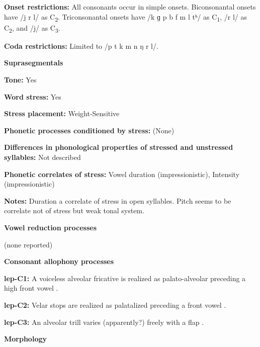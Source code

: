 \textbf{Onset restrictions:} All consonants occur in simple onsets. Biconsonantal onsets have /j r l/ as C\textsubscript{2}. Triconsonantal onsets have /k ɡ p b f m l tʰ/ as C\textsubscript{1}, /r l/ as C\textsubscript{2}, and /j/ as C\textsubscript{3}.



\textbf{Coda restrictions:} Limited to /p t k m n ŋ r l/.



\textbf{Suprasegmentals}



\textbf{Tone:} Yes



\textbf{Word stress:} Yes



\textbf{Stress placement:} Weight-Sensitive



\textbf{Phonetic processes conditioned by stress:} (None)



\textbf{Differences in phonological properties of stressed and unstressed syllables:} Not described



\textbf{Phonetic correlates of stress:} Vowel duration (impressionistic), Intensity (impressionistic)



\textbf{Notes:} Duration a correlate of stress in open syllables. Pitch seems to be correlate not of stress but weak tonal system.



\textbf{Vowel reduction processes}



(none reported)



\textbf{Consonant allophony processes}



\textbf{lep-C1:} A voiceless alveolar fricative is realized as palato-alveolar preceding a high front vowel \citep[27]{Plaisier2007}.



\textbf{lep-C2:} Velar stops are realized as palatalized preceding a front vowel \citep[21]{Plaisier2007}.



\textbf{lep-C3:} An alveolar trill varies (apparently?) freely with a flap \citep[28]{Plaisier2007}.



\textbf{Morphology}



